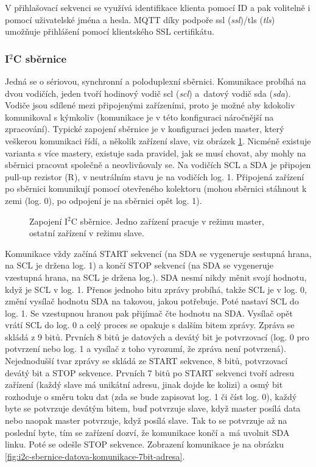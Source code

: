 V přihlašovací sekvenci se využívá identifikace klienta pomocí ID a pak volitelně i pomocí uživatelské jména a hesla. MQTT díky podpoře \acrshort{ssl} (\textit{\acrlong{ssl}})/\acrshort{tls} (\textit{\acrlong{tls}}) umožňuje přihlášení pomocí klientského SSL certifikátu.
\setnowidow[2]
\subsubsection{I$^2$C sběrnice}
Jedná se o sériovou, synchronní a poloduplexní sběrnici. Komunikace probíhá na dvou vodičích, jeden tvoří hodinový vodič \acrshort{scl} (\textit{\acrlong{scl}}) a~datový vodič \acrshort{sda} (\textit{\acrlong{sda}}). Vodiče jsou sdílené mezi připojenými zařízeními, proto je možné aby kdokoliv komunikoval s kýmkoliv (komunikace je v této konfiguraci náročnější na zpracování). Typické zapojení sběrnice je v konfiguraci jeden master, který veškerou komunikaci řídí, a několik zařízení slave, viz obrázek \ref{fig:i2c-sbernice}. Nicméně existuje varianta s více mastery, existuje sada pravidel, jak se musí chovat, aby mohly na sběrnici pracovat společně a neovlivňovaly se. Na vodičích SCL a SDA je připojen pull-up rezistor (R), v neutrálním stavu je na vodičích log. 1. Připojená zařízení po sběrnici komunikují pomocí otevřeného kolektoru (mohou sběrnici stáhnout k zemi (log. 0), po odpojení je na sběrnici opět log. 1).

\begin{figure}[H]
    \centering
    \def\svgwidth{\columnwidth}
    
    \caption[Zapojení I$^2$C sběrnice.]{Zapojení I$^2$C sběrnice. Jedno zařízení pracuje v režimu master, ostatní zařízení v režimu slave.}
    \label{fig:i2c-sbernice}
\end{figure}

Komunikace vždy začíná START sekvencí (na SDA se vygeneruje sestupná hrana, na SCL je držena log. 1) a končí STOP sekvencí (na SDA se vygeneruje vzestupná hrana, na SCL je držena log.). SDA nesmí nikdy měnit svojí hodnotu, když je SCL v log. 1.  Přenos jednoho bitu zprávy probíhá, takže SCL je v log. 0, změní vysílač hodnotu SDA na takovou, jakou potřebuje. Poté nastaví SCL do log. 1. Se vzestupnou hranou pak přijímač čte hodnotu na SDA. Vysílač opět vrátí SCL do log. 0 a celý proces se opakuje s dalším bitem zprávy. Zpráva se skládá z 9 bitů. Prvních 8 bitů je datových a devátý bit je potvrzovací (log. 0 pro potvrzení nebo log. 1 a vysílač z toho vyrozumí, že zpráva není potvrzená). Nejednodušší tvar zprávy se skládá ze START sekvence, 8 bitů, potvrzovací devátý bit a STOP sekvence. Prvních 7 bitů po START sekvenci tvoří adresu zařízení (každý slave má unikátní adresu, jinak dojde ke kolizi) a osmý bit rozhoduje o směru toku dat (zda se bude zapisovat log. 1 či číst log. 0), každý byte se potvrzuje devátým bitem, buď potvrzuje slave, když master posílá data nebo naopak master potvrzuje, když posílá slave. Tak to se potvrzuje až na poslední byte, tím se zařízení dozví, že komunikace končí a~má uvolnit SDA linku. Poté se odešle STOP sekvence. Zobrazení komunikace je na obrázku \ref{fig:i2c-sbernice-datova-komunikace-7bit-adresa}.

